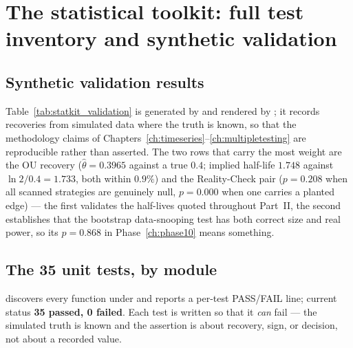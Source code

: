 \section{The statistical toolkit: full test inventory and synthetic validation}
\label{ch:statkitappendix}

\subsection{Synthetic validation results}



Table~\ref{tab:statkit_validation} is generated by
 and rendered by
; it records recoveries from simulated
data where the truth is known, so that the methodology claims of
Chapters~\ref{ch:timeseries}--\ref{ch:multipletesting} are reproducible rather than
asserted. The two rows that carry the most weight are the OU recovery
($\hat\theta=0.3965$ against a true $0.4$; implied half-life $1.748$ against
$\ln2/0.4=1.733$, both within $0.9\%$) and the Reality-Check pair
($p=0.208$ when all scanned strategies are genuinely null, $p=0.000$ when one carries a
planted edge) --- the first validates the half-lives quoted throughout Part~II, the second
establishes that the bootstrap data-snooping test has both correct size and real power, so
its $p=0.868$ in Phase~\ref{ch:phase10} means something.

\subsection{The 35 unit tests, by module}

 discovers every  function under
 and reports a per-test PASS/FAIL line; current status
\textbf{35 passed, 0 failed}. Each test is written so that it \emph{can} fail --- the
simulated truth is known and the assertion is about recovery, sign, or decision, not about
a recorded value.

